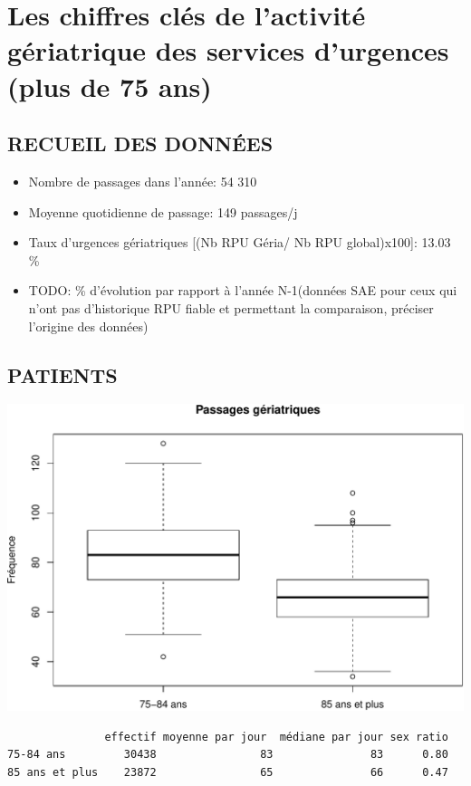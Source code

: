 \documentclass[]{article}
\begin{document}
\section{Les chiffres clés de l'activité gériatrique des services
d'urgences (plus de 75
ans)}\label{les-chiffres-cles-de-lactivite-geriatrique-des-services-durgences-plus-de-75-ans}

\subsection{RECUEIL DES DONNÉES}\label{recueil-des-donnees-2}

\begin{itemize}
\itemsep1pt\parskip0pt
\item
  Nombre de passages dans l'année: 54 310
\item
  Moyenne quotidienne de passage: 149 passages/j
\item
  Taux d'urgences gériatriques {[}(Nb RPU Géria/ Nb RPU global)x100{]}:
  13.03 \%
\item
  TODO: \% d'évolution par rapport à l'année N-1(données SAE pour ceux
  qui n'ont pas d'historique RPU fiable et permettant la comparaison,
  préciser l'origine des données)
\end{itemize}

\subsection{PATIENTS}\label{patients-2}

\includegraphics{rapport2014_V4_files/figure-latex/sexe75-1.pdf}

\begin{verbatim}
               effectif moyenne par jour  médiane par jour sex ratio
75-84 ans         30438                83               83      0.80
85 ans et plus    23872                65               66      0.47
\end{verbatim}
\end{document}

